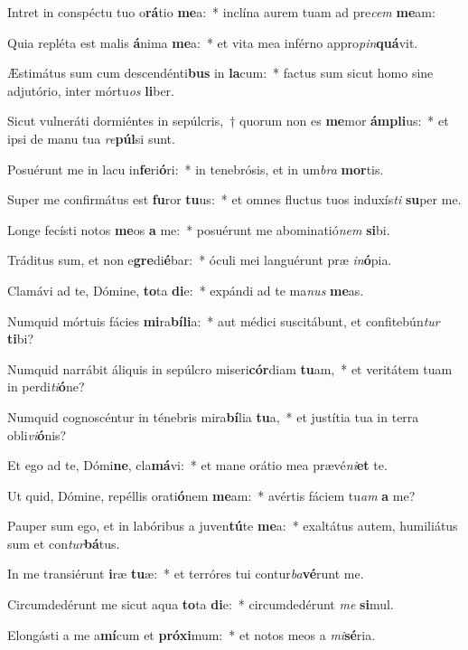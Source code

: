 \item Intret in conspéctu tuo o\textbf{rá}tio \textbf{me}a:~* inclína aurem tuam ad pre\textit{cem} \textbf{me}am:
\item Quia repléta est malis \textbf{á}nima \textbf{me}a:~* et vita mea inférno appro\textit{pin}\textbf{quá}vit.
\item Æstimátus sum cum descendénti\textbf{bus} in \textbf{la}cum:~* factus sum sicut homo sine adjutório, inter mórtu\textit{os} \textbf{li}ber.
\item Sicut vulneráti dormiéntes in sepúlcris,~† quorum non es \textbf{me}mor \textbf{ám}\textbf{pli}us:~* et ipsi de manu tua \textit{re}\textbf{púl}si sunt.
\item Posuérunt me in lacu in\textbf{fe}ri\textbf{ó}ri:~* in tenebrósis, et in um\textit{bra} \textbf{mor}tis.
\item Super me confirmátus est \textbf{fu}ror \textbf{tu}us:~* et omnes fluctus tuos induxís\textit{ti} \textbf{su}per me.
\item Longe fecísti notos \textbf{me}os \textbf{a} me:~* posuérunt me abominatió\textit{nem} \textbf{si}bi.
\item Tráditus sum, et non e\textbf{gre}di\textbf{é}bar:~* óculi mei languérunt præ \textit{in}\textbf{ó}pia.
\item Clamávi ad te, Dómine, \textbf{to}ta \textbf{di}e:~* expándi ad te ma\textit{nus} \textbf{me}as.
\item Numquid mórtuis fácies \textbf{mi}ra\textbf{bí}\textbf{li}a:~* aut médici suscitábunt, et confitebún\textit{tur} \textbf{ti}bi?
\item Numquid narrábit áliquis in sepúlcro miseri\textbf{cór}diam \textbf{tu}am,~* et veritátem tuam in perdi\textit{ti}\textbf{ó}ne?
\item Numquid cognoscéntur in ténebris mira\textbf{bí}lia \textbf{tu}a,~* et justítia tua in terra obli\textit{vi}\textbf{ó}nis?
\item Et ego ad te, Dómi\textbf{ne}, cla\textbf{má}vi:~* et mane orátio mea prævé\textit{ni}\textbf{et} te.
\item Ut quid, Dómine, repéllis orati\textbf{ó}nem \textbf{me}am:~* avértis fáciem tu\textit{am} \textbf{a} me?
\item Pauper sum ego, et in labóribus a juven\textbf{tú}te \textbf{me}a:~* exaltátus autem, humiliátus sum et con\textit{tur}\textbf{bá}tus.
\item In me transiérunt \textbf{i}ræ \textbf{tu}æ:~* et terróres tui contur\textit{ba}\textbf{vé}runt me.
\item Circumdedérunt me sicut aqua \textbf{to}ta \textbf{di}e:~* circumdedérunt \textit{me} \textbf{si}mul.
\item Elongásti a me a\textbf{mí}cum et \textbf{pró}\textbf{xi}mum:~* et notos meos a \textit{mi}\textbf{sé}ria.
